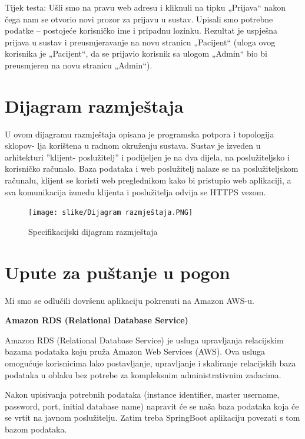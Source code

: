 			Tijek testa: Ušli smo na pravu web adresu i kliknuli na tipku „Prijava“ nakon čega nam se otvorio novi prozor za prijavu u sustav. Upisali smo potrebne podatke – postojeće korisničko ime i pripadnu lozinku. Rezultat je uspješna prijava u sustav i preusmjeravanje na novu stranicu „Pacijent“ (uloga ovog korisnika je „Pacijent“, da se prijavio korisnik sa ulogom „Admin“ bio bi preusmjeren na novu stranicu „Admin“).
				\eject
		
		
		\section{Dijagram razmještaja}
			
		U ovom dijagramu razmještaja opisana je programska potpora i topologija sklopov-
		lja korištena u radnom okruženju sustava. Sustav je izveden u arhitekturi ”klijent-
		poslužitelj” i podijeljen je na dva dijela, na poslužiteljsko i korisničko računalo.
		Baza podataka i web poslužitelj nalaze se na poslužiteljskom računalu, klijent se
		koristi web preglednikom kako bi pristupio web aplikaciji, a sva komunikacija
		izmedu klijenta i poslužitelja odvija se HTTPS vezom.
		
		\begin{figure}[H]
			\texttt{[image: slike/Dijagram razmještaja.PNG]} %
			\centering
			\caption{Specifikacijski dijagram razmještaja}
			\label{fig:promjene}
		\end{figure}
			
			\eject 
		
		\section{Upute za puštanje u pogon}
		
			Mi smo se odlučili dovršenu aplikaciju pokrenuti na Amazon AWS-u.
			\newline
			
	\textbf{Amazon RDS  (Relational Database Service) }
	\newline
	
	       Amazon RDS (Relational Database Service) je usluga upravljanja relacijskim bazama podataka koju pruža Amazon Web Services (AWS). Ova usluga omogućuje korisnicima lako postavljanje, upravljanje i skaliranje relacijskih baza podataka u oblaku bez potrebe za kompleksnim administrativnim zadacima.
	       
	       Nakon upisivanja potrebnih podataka (instance identifier, master username, password, port, initial database name) napravit će se naša baza podataka koja će se vrtit na javnom poslužitelju. Zatim treba SpringBoot aplikaciju povezati s tom bazom podataka.
			
